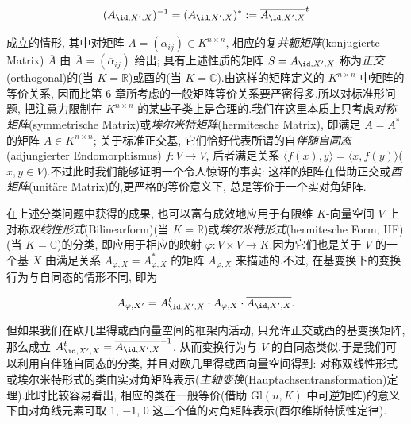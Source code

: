 \[
(A_{\id, X', X})^{-1} = (A_{\id, X', X})^* := \overline{A_{\id, X', X}}^{t}
\]

成立的情形, 其中对矩阵 $A = (\alpha_{ij}) \in K^{n \times n}$, 相应的复\emph{共轭矩阵}(\textup{konjugierte Matrix}) $\overline{A}$ 由 $\overline{A} = (\overline{\alpha}_{ij})$ 给出; 具有上述性质的矩阵 $S = A_{\id, X', X}$ 称为\emph{正交}(\textup{orthogonal})的(当 $K = \mathbb{R}$)或酉的(当 $K = \mathbb{C}$).由这样的矩阵定义的 $K^{n \times n}$ 中矩阵的等价关系, 因而比第 6 章所考虑的一般矩阵等价关系要严密得多.所以对标准形问题, 把注意力限制在 $K^{n \times n}$ 的某些子类上是合理的.我们在这里本质上只考虑\emph{对称矩阵}(\textup{symmetrische Matrix})或\emph{埃尔米特矩阵}(\textup{hermitesche Matrix}), 即满足 $A = A^*$ 的矩阵 $A \in K^{n \times n}$; 关于标准正交基, 它们恰好代表所谓的自\emph{伴随自同态}(\textup{adjungierter Endomorphismus}) $f \colon V \longrightarrow V$, 后者满足关系 $\langle f(x), y \rangle = \langle x, f(y) \rangle$($x, y \in V$).不过此时我们能够证明一个令人惊讶的事实: 这样的矩阵在借助正交或\emph{酉矩阵}(\textup{unitäre Matrix})的,更严格的等价意义下, 总是等价于一个实对角矩阵.

在上述分类问题中获得的成果, 也可以富有成效地应用于有限维 $K$-向量空间 $V$ 上对称\emph{双线性形式}(\textup{Bilinearform})(当 $K = \mathbb{R}$)或\emph{埃尔米特形式}(\textup{hermitesche Form; HF})(当 $K = \mathbb{C}$)的分类, 即应用于相应的映射 $\varphi \colon V \times V \longrightarrow K$.因为它们也是关于 $V$ 的一个基 $X$ 由满足关系 $A_{\varphi, X} = A_{\varphi, X}^*$ 的矩阵 $A_{\varphi, X}$ 来描述的.不过, 在基变换下的变换行为与自同态的情形不同, 即为

\[
A_{\varphi, X'} = A_{\id, X', X}^{t} \cdot A_{\varphi, X} \cdot \overline{A_{\id, X', X}}\text{.}
\]

但如果我们在欧几里得或酉向量空间的框架内活动, 只允许正交或酉的基变换矩阵, 那么成立 $A_{\id, X', X}^{t} = \overline{A_{\id, X', X}}^{-1}$, 从而变换行为与 $V$ 的自同态类似.于是我们可以利用自伴随自同态的分类, 并且对欧几里得或酉向量空间得到: 对称双线性形式或埃尔米特形式的类由实对角矩阵表示(\emph{主轴变换}(\textup{Hauptachsentransformation})定理).此时比较容易看出, 相应的类在一般等价(借助 $\mathrm{Gl}(n, K)$ 中可逆矩阵)的意义下由对角线元素可取 $1$, $-1$, $0$ 这三个值的对角矩阵表示(西尔维斯特惯性定律).

